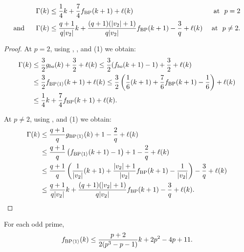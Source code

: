 \begin{cor}
\begin{align*}
  & \Gamma(k) \leq \frac{1}{4}k + \frac{7}{4}f_{\textup{BP}}(k+1) + \ell(k) & \text{ at }\ p = 2 \\
  \text{and}\ \ \ \ \  & \Gamma(k) \leq \frac{q+1}{q|v_2|}k + \frac{(q+1)(|v_2|+1)}{q|v_2|}f_{\textup{BP}}(k+1) - \frac{3}{q} + \ell(k) & \text{ at }\ p \neq 2. 
\end{align*}
\end{cor}

\begin{proof}
  At $p = 2$, using , ,  and (1) we obtain:
  \begin{align*}
    \Gamma(k)
    &\leq \frac{3}{2} g_{bo}(k) + \frac{3}{2} + \ell(k) 
    \leq \frac{3}{2} (f_{bo}(k+1) - 1) + \frac{3}{2} + \ell(k) \\
    &\leq \frac{3}{2} f_{\mathrm{BP} \langle 1 \rangle}(k+1) + \ell(k) 
    \leq \frac{3}{2} \left( \frac{1}{6}(k+1) + \frac{7}{6} f_{\mathrm{BP}}(k+1) - \frac{1}{6} \right) + \ell(k) \\
    &\leq \frac{1}{4}k  + \frac{7}{4} f_{\mathrm{BP}}(k+1) + \ell(k).
  \end{align*}
  
  At $p \neq 2$,
  using ,  and (1) we obtain:
  \begin{align*}
    \Gamma(k)
    &\leq \frac{q+1}{q} g_{\textup{BP}\langle 1 \rangle}(k) + 1 - \frac{2}{q} + \ell(k) \\
    &\leq \frac{q+1}{q} \left( f_{\textup{BP}\langle 1 \rangle}(k+1) - 1 \right) + 1 - \frac{2}{q} + \ell(k) \\
    &\leq \frac{q+1}{q} \left( \frac{1}{|v_{2}|}(k+1) + \frac{|v_2| + 1}{|v_{2}|} f_{\mathrm{BP}}(k+1) - \frac{1}{|v_{2}|} \right) - \frac{3}{q} + \ell(k) \\
    &\leq \frac{q+1}{q|v_{2}|}k + \frac{(q+1)(|v_2| + 1)}{q|v_{2}|} f_{\mathrm{BP}}(k+1) - \frac{3}{q} + \ell(k). 
  \end{align*}
\end{proof}

\begin{cor}
  For each odd prime,
  $$ f_{\textup{BP}\langle 1 \rangle}(k) \leq \frac{p+2}{2(p^3 - p - 1)}k + 2p^2 - 4p + 11. $$
\end{cor}

